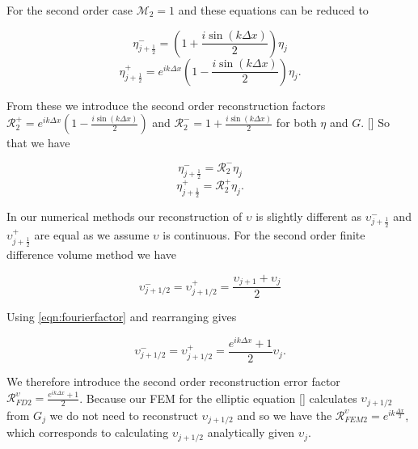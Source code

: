 For the second order case $\mathcal{M}_2 = 1$ and these equations can be reduced to 

\begin{equation*}
\eta^-_{j+\frac{1}{2}} = \left(1  + \frac{i\sin\left(k\Delta x\right)}{2} \right){\eta}_j
\end{equation*}
\begin{equation*}
\eta^+_{j+\frac{1}{2}} = e^{ik\Delta x}\left(1  - \frac{i\sin\left(k\Delta x\right)}{2} \right){\eta}_{j}.
\end{equation*}
	
From these we introduce the second order reconstruction factors\\ $\mathcal{R}^+_2 = e^{ik\Delta x}\left(1  - \frac{i\sin\left(k\Delta x\right)}{2} \right)$ and $\mathcal{R}^-_2 = 1  + \frac{i\sin\left(k\Delta x\right)}{2}$ for both $\eta$ and $G$. [] So that we have 

\begin{equation*}
\eta^-_{j+\frac{1}{2}} = \mathcal{R}^-_2 {\eta}_j
\end{equation*}
\begin{equation*}
\eta^+_{j+\frac{1}{2}} = \mathcal{R}^+_2{\eta}_{j}.
\end{equation*}

In our numerical methods our reconstruction of $\upsilon$ is slightly different as $\upsilon ^-_{j+\frac{1}{2}}$ and $\upsilon ^+_{j+\frac{1}{2}}$ are equal as we assume $\upsilon$ is continuous. For the second order finite difference volume method we have

\begin{equation*}
\upsilon^-_{j + 1/2} = \upsilon^+_{j + 1/2} = \frac{\upsilon_{j+1} + \upsilon_{j}}{2}
\end{equation*}

Using \eqref{eqn:fourierfactor} and rearranging gives

\begin{equation*}
\label{eqn:2ndreconu}
\upsilon^-_{j + 1/2} = \upsilon^+_{j + 1/2} = \frac{e^{ik\Delta x } + 1}{2} \upsilon_{j}.
\end{equation*}

We therefore introduce the second order reconstruction error factor $\mathcal{R}^\upsilon_{FD2} = \frac{e^{ik\Delta x } + 1}{2}$. Because our FEM for the elliptic equation [] calculates $\upsilon_{j+1/2}$ from $G_j$ we do not need to reconstruct $\upsilon_{j+1/2}$ and so we have the $\mathcal{R}^\upsilon_{FEM2} = e^{ik\frac{\Delta x}{2} }$, which corresponds to calculating $\upsilon_{j+1/2}$ analytically given $\upsilon_{j}$. 

